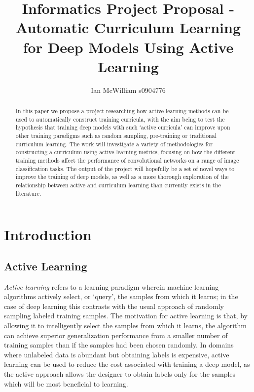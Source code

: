 \documentclass[a4paper,11pt]{article}
\begin{document}
\title{Informatics Project Proposal - Automatic Curriculum Learning for Deep Models Using Active Learning}
\author{Ian McWilliam s0904776}
\date{}
\maketitle

\tableofcontents

\begin{abstract}
In this paper we propose a project researching how active learning methods can be used to automatically construct training curricula, with the aim being to test the hypothesis that training deep models with such `active curricula' can improve upon other training paradigms such as  random sampling, pre-training or traditional curriculum learning. The work will investigate a variety of methodologies for constructing a curriculum using active learning metrics, focusing on how the different training methods affect the performance of convolutional networks on a range of image classification tasks. The output of the project will hopefully be a set of novel ways to improve the training of deep models, as well as a more thorough exploration of the relationship between active and curriculum learning than currently exists in the literature.
\end{abstract}

\section{Introduction}

\subsection{Active Learning}
\textit{Active learning} refers to a learning paradigm wherein machine learning algorithms actively select, or `query', the samples from which it learns; in the case of deep learning this contrasts with the usual approach of randomly sampling labeled training samples. The motivation for active learning is that, by allowing it to intelligently select the samples from which it learns, the algorithm can achieve superior generalization performance from a smaller number of training samples than if the samples had been chosen randomly. In domains where unlabeled data is abundant but obtaining labels is expensive, active learning can be used to reduce the cost associated with training a deep model, as the active approach allows the designer to obtain labels only for the samples which will be most beneficial to learning.
\end{document}
